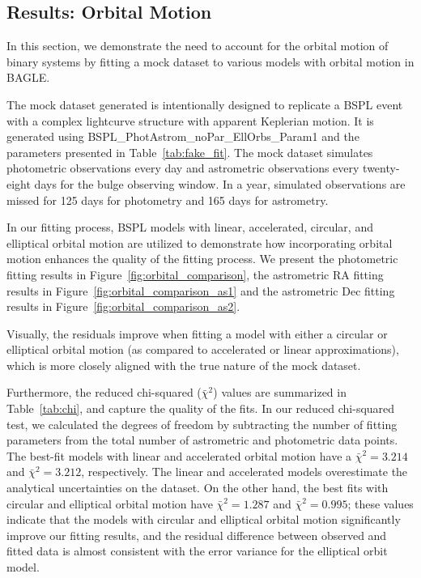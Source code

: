 \documentclass[twocolumn]{aastex701}
\begin{document}
\subsection{Results: Orbital Motion}
\label{sec:results_om}



In this section, we demonstrate the need to account for the orbital motion of binary systems by fitting a mock dataset to various models with orbital motion in BAGLE. 

The mock dataset generated is intentionally designed to replicate a BSPL event with a complex lightcurve structure with apparent Keplerian motion. It is generated using BSPL\_PhotAstrom\_noPar\_EllOrbs\_Param1 and the parameters presented in Table~\ref{tab:fake_fit}. The mock dataset simulates photometric observations every day and astrometric observations every twenty-eight days for the bulge observing window. In a year, simulated observations are missed for 125 days for photometry and 165 days for astrometry. 

In our fitting process, BSPL models with linear, accelerated, circular, and elliptical orbital motion are utilized to demonstrate how incorporating orbital motion enhances the quality of the fitting process. We present the photometric fitting results in Figure~\ref{fig:orbital_comparison}, the astrometric RA fitting results in Figure~\ref{fig:orbital_comparison_as1} and the astrometric Dec fitting results in Figure~\ref{fig:orbital_comparison_as2}. 

Visually, the residuals improve when fitting a model with either a circular or elliptical orbital motion (as compared to accelerated or linear approximations), which is more closely aligned with the true nature of the mock dataset. 

Furthermore, the reduced chi-squared ($\bar{\chi}^2$) values are summarized in Table~\ref{tab:chi}, and capture the quality of the fits. In our reduced chi-squared test, we calculated the degrees of freedom by subtracting the number of fitting parameters from the total number of astrometric and photometric data points. The best-fit models with linear and accelerated orbital motion have a $\bar{\chi}^2 = 3.214$ and $\bar{\chi}^2 = 3.212$, respectively. The linear and accelerated models overestimate the analytical uncertainties on the dataset. On the other hand, the best fits with circular and elliptical orbital motion have $\bar{\chi}^2 = 1.287$ and $\bar{\chi}^2 = 0.995$; these values indicate that the models with circular and elliptical orbital motion significantly improve our fitting results, and the residual difference between observed and fitted data is almost consistent with the error variance for the elliptical orbit model. 
\end{document}
